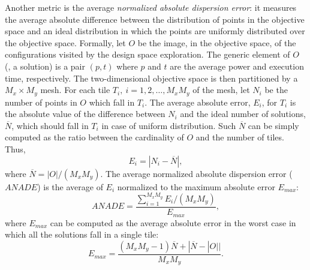 Another metric is the average \emph{normalized absolute dispersion
error}: it measures
the average absolute difference between the distribution of points in
the objective space and an ideal distribution in which the points are
uniformly distributed over the objective space. 
Formally, let $O$ be
the image, in the objective space, of the configurations visited by
the design space exploration. The generic element of $O$ (\ie, a
solution) is a pair $(p,t)$ where $p$ and $t$ are the average power
and execution time, respectively. The two-dimensional objective space
is then partitioned by a $M_x \times M_y$ mesh. For each tile $T_i,
\ i=1, 2, \ldots, M_xM_y$ of the mesh, let $N_i$ be the number
of points in $O$ which fall in $T_i$. The average absolute error, $E_i$, for
$T_i$ is the absolute value of the difference between $N_i$ and the
ideal number of solutions, $\overline{N}$, which should fall in $T_i$
in case of uniform distribution. Such $\overline{N}$ can be simply
computed as the ratio between the cardinality of $O$ and the number of
tiles. Thus,
\[ E_i = |N_i - \overline{N}|, \]
where $\overline{N} = |O| / (M_x M_y)$. The average
normalized absolute dispersion error ($ANADE$) is the average of $E_i$
normalized to the maximum absolute error $E_{max}$:
\[ ANADE = \frac{\sum_{i=1}^{M_xM_y} E_i/(M_xM_y)}{E_{max}}, \]
where $E_{max}$ can be computed as the average absolute error in the worst
case in which all the solutions fall in a single tile:
\[ E_{max} = \frac{(M_x M_y - 1) \overline{N} + |\overline{N} -
    |O|| }{M_x M_y}. \] 

%

